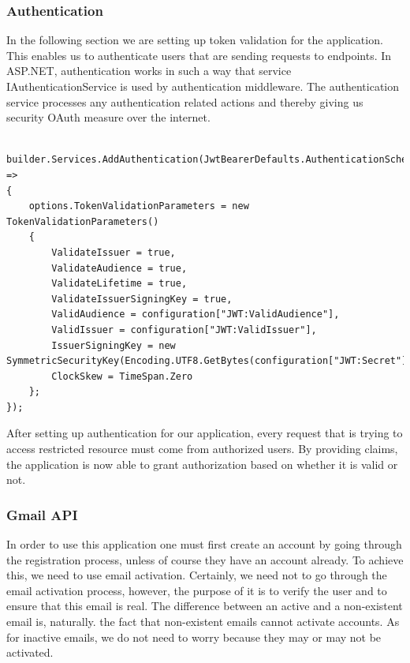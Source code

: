 \documentclass[singlespacing,12pt,parskip,headsepline,consistentlayout]{article}
\begin{document}
\pagebreak
\subsubsection{Authentication}

In the following section we are setting up token validation for the application. This enables us to authenticate users that are sending requests to endpoints. In ASP.NET, authentication works in such a way that service IAuthenticationService is used by authentication middleware. The authentication service processes any authentication related actions and thereby giving us security OAuth measure over the internet.

\begin{lstlisting}
    builder.Services.AddAuthentication(JwtBearerDefaults.AuthenticationScheme).AddJwtBearer(options =>
{
    options.TokenValidationParameters = new TokenValidationParameters()
    {
        ValidateIssuer = true,
        ValidateAudience = true,
        ValidateLifetime = true,
        ValidateIssuerSigningKey = true,
        ValidAudience = configuration["JWT:ValidAudience"],
        ValidIssuer = configuration["JWT:ValidIssuer"],
        IssuerSigningKey = new SymmetricSecurityKey(Encoding.UTF8.GetBytes(configuration["JWT:Secret"])),
        ClockSkew = TimeSpan.Zero
    };
});
\end{lstlisting}

After setting up authentication for our application, every request that is trying to access restricted resource must come from authorized users. By providing claims, the application is now able to grant authorization based on whether it is valid or not.

\pagebreak

\subsubsection{Gmail API}

In order to use this application one must first create an account by going through the registration process, unless of course they have an account already. To achieve this, we need to use email activation. Certainly, we need not to go through the email activation process, however, the purpose of it is to verify the user and to ensure that this email is real. The difference between an active and a non-existent email is, naturally. the fact that non-existent emails cannot activate accounts. As for inactive emails, we do not need to worry because they may or may not be activated.
\end{document}
